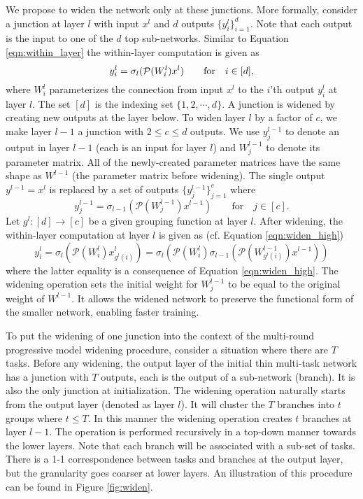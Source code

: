 \documentclass[10pt,twocolumn,letterpaper]{article}
\begin{document}
We propose to widen the network only at these junctions. More formally, consider a junction at layer $l$ with input $x^l$ and $d$ outputs $\{y^l_i\}_{i=1}^d$. Note that each output is the input to one of the $d$ top sub-networks. Similar to Equation \ref{eqn:within_layer} the within-layer computation is given as
\begin{equation}
\vspace{-1mm}
\label{eqn:widen_high}
y^l_i = \sigma_l(\mathcal{P}(W^l_i) x^l)  \quad\quad \mbox{for} \quad i \in [d],
\end{equation}
\noindent where $W^l_i$ parameterizes the connection from input $x^l$ to the $i$'th output $y^l_i$ at layer $l$. 
The set $[d]$ is the indexing set $\{1, 2, \cdots, d\}$. A junction is widened by creating new outputs at the layer below. To widen layer $l$ by a factor of $c$, we make layer $l-1$ a junction with $2 \leq c \leq d$ outputs. We use $y^{l-1}_j$ to denote an output in layer $l-1$ (each is an input for layer $l$) and $W^{l-1}_j$ to denote its parameter matrix. All of the newly-created parameter matrices have the same shape as $W^{l-1}$ (the parameter matrix before widening). The single output $y^{l-1}=x^l$ is replaced by a set of outputs $\{y^{l-1}_j\}_{j=1}^{c}$ where
\begin{equation}
\label{eqn:widen_low}
y_j^{l-1} = \sigma_{l-1} (\mathcal{P}(W^{l-1}_j) x^{l-1}) \quad\quad \mbox{for} \quad j \in [c].
\end{equation}
Let $g^l : [d] \to [c]$ be a given grouping function at layer $l$. After widening, the within-layer computation at layer $l$ is given as (cf. Equation \ref{eqn:widen_high})
\begin{equation}
\label{eqn:widened}
y_i^l = \sigma_l(\mathcal{P}(W^l_i) x^l_{g^l(i)}) = \sigma_{l}\left(\mathcal{P}(W^l_i) \sigma_{l-1}(\mathcal{P}(W^{l-1}_{g^l(i)}) x^{l-1})\right)
\end{equation}
\noindent where the latter equality is a consequence of Equation \ref{eqn:widen_high}. The widening operation sets the initial weight for $W^{l-1}_j$ to be equal to the original weight of $W^{l-1}$. It allows the widened network to preserve the functional form of the smaller network, enabling faster training.

To put the widening of one junction into the context of the multi-round progressive model widening procedure, consider a situation where there are $T$ tasks. Before any widening, the output layer of the initial thin multi-task network has a junction with $T$ outputs, each is the output of a sub-network (branch). It is also the only junction at initialization. The widening operation naturally starts from the output layer (denoted as layer $l$). It will cluster the $T$ branches into $t$ groups where $t \leq T$. In this manner the widening operation creates $t$ branches at layer $l-1$. The operation is performed recursively in a top-down manner towards the lower layers. Note that each branch will be associated with a sub-set of tasks. There is a 1-1 correspondence between tasks and branches at the output layer, but the granularity goes coarser at lower layers. An illustration of this procedure can be found in Figure \ref{fig:widen}. 
\end{document}
